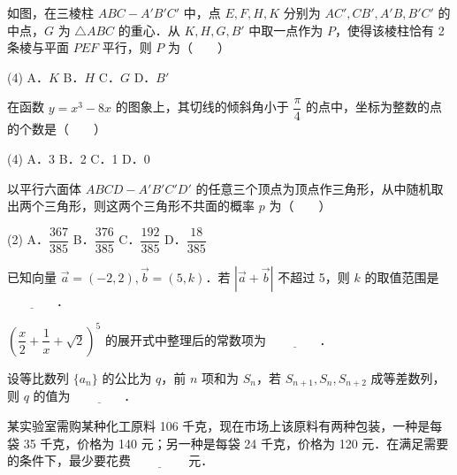 \begin{question}
如图，在三棱柱 $ABC - A'B'C'$ 中，点 $E, F, H, K$ 分别为 $AC', CB', A'B, B'C'$ 的中点，$G$ 为 $\triangle ABC$ 的重心．从 $K, H, G, B'$ 中取一点作为 $P$，使得该棱柱恰有 2 条棱与平面 $PEF$ 平行，则 $P$ 为\mbox{（　　）}
\nopagebreak[4]
\begin{center}\end{center}
\nopagebreak[4]
\begin{gkopts}(4)
\task A．$K$
\task B．$H$
\task C．$G$
\task D．$B'$
\end{gkopts}

\end{question}
\begin{question}
在函数 $y = x^3 - 8x$ 的图象上，其切线的倾斜角小于 $\dfrac{\pi}{4}$ 的点中，坐标为整数的点的个数是\mbox{（　　）}

\begin{gkopts}(4)
\task A．3
\task B．2
\task C．1
\task D．0
\end{gkopts}

\end{question}
\begin{question}
以平行六面体 $ABCD - A'B'C'D'$ 的任意三个顶点为顶点作三角形，从中随机取出两个三角形，则这两个三角形不共面的概率 $p$ 为\mbox{（　　）}

\begin{gkopts}(2)
\task A．$\dfrac{367}{385}$
\task B．$\dfrac{376}{385}$
\task C．$\dfrac{192}{385}$
\task D．$\dfrac{18}{385}$
\end{gkopts}

\end{question}

\begin{question}
已知向量 $\vec{a} = (-2, 2), \vec{b} = (5, k)$．若 $|\vec{a} + \vec{b}|$ 不超过 5，则 $k$ 的取值范围是 $\underline{\qquad\qquad}$．

\end{question}
\begin{question}
$\left(\dfrac{x}{2} + \dfrac{1}{x} + \sqrt{2}\right)^5$ 的展开式中整理后的常数项为 $\underline{\qquad\qquad}$．

\end{question}
\begin{question}
设等比数列 $\{a_n\}$ 的公比为 $q$，前 $n$ 项和为 $S_n$，若 $S_{n+1}, S_n, S_{n+2}$ 成等差数列，则 $q$ 的值为 $\underline{\qquad\qquad}$．

\end{question}
\begin{question}
某实验室需购某种化工原料 106 千克，现在市场上该原料有两种包装，一种是每袋 35 千克，价格为 140 元；另一种是每袋 24 千克，价格为 120 元．在满足需要的条件下，最少要花费 $\underline{\qquad\qquad}$ 元．

\end{question}

